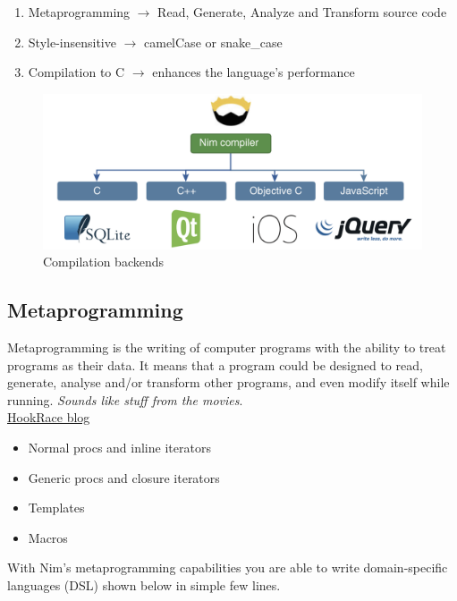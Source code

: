 \documentclass[10pt, a4paper, twocolumn]{article} %
\begin{document}
\begin{enumerate}
	\item Metaprogramming $\longrightarrow$ Read, Generate, Analyze and Transform source code
	\item Style-insensitive $\longrightarrow$ camelCase or snake\_case
	\item Compilation to C $\longrightarrow$ enhances the language's performance
\end{enumerate}

\begin{figure}[h!]
	\includegraphics[width=\linewidth]{compiler.png} %
	\caption{Compilation backends} %
	\label{Nim Compilers} %
\end{figure}
\newpage

\subsection{Metaprogramming}

Metaprogramming is the writing of computer programs with the ability to treat programs as their data. It means that a program could be designed to read, generate, analyse and/or transform other programs, and even modify itself while running. \textit{Sounds like stuff from the movies}.  \\

\href{https://hookrace.net/blog/introduction-to-metaprogramming-in-nim/}{HookRace blog}


\begin{itemize}
	\item Normal procs and inline iterators
	\item Generic procs  and closure iterators
	\item Templates
	\item Macros
\end{itemize}

With Nim's metaprogramming capabilities you are able to write domain-specific languages (DSL) shown below in simple few lines.
\end{document}
